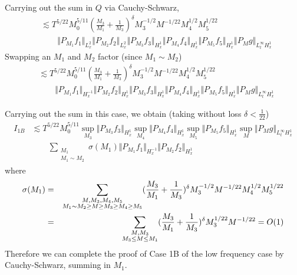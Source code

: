 \documentclass[12pt,letterpaper,leqno]{amsart}
\theoremstyle{plain}
\numberwithin{equation}{section}
\numberwithin{theorem}{section}
\numberwithin{proposition}{section}
\numberwithin{lemma}{section}
\numberwithin{corollary}{section}
\begin{document}
Carrying out the sum in $Q$ via Cauchy-Schwarz, 
\begin{align*}
& \lesssim T^{5/22}M_{0}^{5/11}(\frac{M_{3}}{M_{1}}+\frac{1}{M_{3}})^{\delta
}M_{3}^{-1/2}M^{-1/22}M_{4}^{1/2}M_{5}^{1/22} \\
& \qquad \Vert P_{M_{1}}f_{1}\Vert _{L_{x}^{2}}\Vert P_{M_{2}}f_{2}\Vert
_{L_{x}^{2}}\Vert P_{M_{3}}f_{3}\Vert _{H_{x}^{1}}\Vert P_{M_{4}}f_{4}\Vert
_{H_{x}^{1}}\Vert P_{M_{5}}f_{5}\Vert _{H_{x}^{1}}\Vert P_{M}g\Vert
_{L_{t}^{\infty }H_{x}^{1}}
\end{align*}%
Swapping an $M_{1}$ and $M_{2}$ factor (since $M_{1}\sim M_{2}$) 
\begin{align*}
& \lesssim T^{5/22}M_{0}^{5/11}(\frac{M_{3}}{M_{1}}+\frac{1}{M_{3}})^{\delta
}M_{3}^{-1/2}M^{-1/22}M_{4}^{1/2}M_{5}^{1/22} \\
& \qquad \Vert P_{M_{1}}f_{1}\Vert _{H_{x}^{-1}}\Vert P_{M_{2}}f_{2}\Vert
_{H_{x}^{1}}\Vert P_{M_{3}}f_{3}\Vert _{H_{x}^{1}}\Vert P_{M_{4}}f_{4}\Vert
_{H_{x}^{1}}\Vert P_{M_{5}}f_{5}\Vert _{H_{x}^{1}}\Vert P_{M}g\Vert
_{L_{t}^{\infty }H_{x}^{1}}
\end{align*}

Carrying out the sum in this case, we obtain (taking without loss $\delta <%
\frac{1}{22}$) 
\begin{align*}
I_{1B}& \lesssim T^{5/22}M_{0}^{5/11}\sup_{M_{3}}\Vert P_{M_{3}}f_{3}\Vert
_{H_{x}^{1}}\sup_{M_{4}}\Vert P_{M_{4}}f_{4}\Vert
_{H_{x}^{1}}\sup_{M_{5}}\Vert P_{M_{5}}f_{5}\Vert _{H_{x}^{1}}\sup_{M}\Vert
P_{M}g\Vert _{L_{t}^{\infty }H_{x}^{1}} \\
& \qquad \sum_{\substack{ M_{1}  \\ M_{1}\sim M_{2}}}\sigma (M_{1})\Vert
P_{M_{1}}f_{1}\Vert _{H_{x}^{-1}}\Vert P_{M_{2}}f_{2}\Vert _{H_{x}^{1}}
\end{align*}%
where 
\begin{eqnarray*}
\sigma (M_{1}) &=&\sum_{\substack{ M,M_{3},M_{4},M_{5}  \\ M_{1}\sim
M_{2}\geq M\geq M_{3}\geq M_{4}\geq M_{5}}}(\frac{M_{3}}{M_{1}}+\frac{1}{%
M_{3}})^{\delta }M_{3}^{-1/2}M^{-1/22}M_{4}^{1/2}M_{5}^{1/22} \\
&=&\sum_{\substack{ M,M_{3}  \\ M_{3}\leq M\leq M_{1}}}(\frac{M_{3}}{M_{1}}+%
\frac{1}{M_{3}})^{\delta }M_{3}^{1/22}M^{-1/22}=O(1)
\end{eqnarray*}%
Therefore we can complete the proof of Case 1B of the low frequency case by
Cauchy-Schwarz, summing in $M_{1}$.
\end{document}
